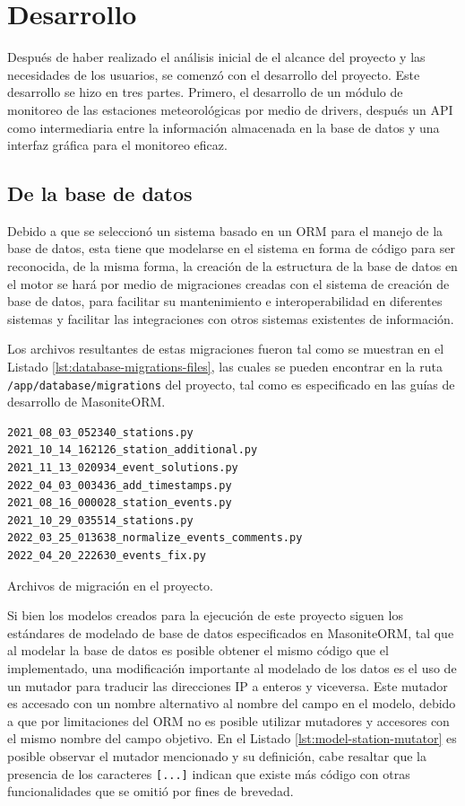 
\section{Desarrollo}

Después de haber realizado el análisis inicial de el alcance del proyecto y las necesidades de los usuarios, se comenzó con el desarrollo del proyecto. Este desarrollo se hizo en tres partes. Primero, el desarrollo de un módulo de monitoreo de las estaciones meteorológicas por medio de drivers,  después un API como intermediaria entre la información almacenada en la base de datos y una interfaz gráfica para el monitoreo eficaz.

\subsection{De la base de datos}

Debido a que se seleccionó un sistema basado en un ORM para el manejo de la base de datos, esta tiene que modelarse en el sistema en forma de código para ser reconocida, de la misma forma, la creación de la estructura de la base de datos en el motor se hará por medio de migraciones creadas con el sistema de creación de base de datos, para facilitar su mantenimiento e interoperabilidad en diferentes sistemas y facilitar las integraciones con otros sistemas existentes de información.

Los archivos resultantes de estas migraciones fueron tal como se muestran en el Listado \ref{lst:database-migrations-files}, las cuales se pueden encontrar en la ruta \texttt{/app/database/migrations} del proyecto, tal como es especificado en las guías de desarrollo de MasoniteORM.

\begin{listing}
\begin{verbatim}
2021_08_03_052340_stations.py
2021_10_14_162126_station_additional.py
2021_11_13_020934_event_solutions.py
2022_04_03_003436_add_timestamps.py
2021_08_16_000028_station_events.py
2021_10_29_035514_stations.py
2022_03_25_013638_normalize_events_comments.py
2022_04_20_222630_events_fix.py
\end{verbatim}
\caption{Archivos de migración en el proyecto.}
\label{lst:database-migrations-files}
\end{listing}

Si bien los modelos creados para la ejecución de este proyecto siguen los estándares de modelado de base de datos especificados en MasoniteORM, tal que al modelar la base de datos es posible obtener el mismo código que el implementado, una modificación importante al modelado de los datos es el uso de un mutador para traducir las direcciones IP a enteros y viceversa. Este mutador es accesado con un nombre alternativo al nombre del campo en el modelo, debido a que por limitaciones del ORM no es posible utilizar mutadores y accesores con el mismo nombre del campo objetivo. En el Listado \ref{lst:model-station-mutator} es posible observar el mutador mencionado y su definición, cabe resaltar que la presencia de los caracteres \texttt{[...]} indican que existe más código con otras funcionalidades que se omitió por fines de brevedad.


